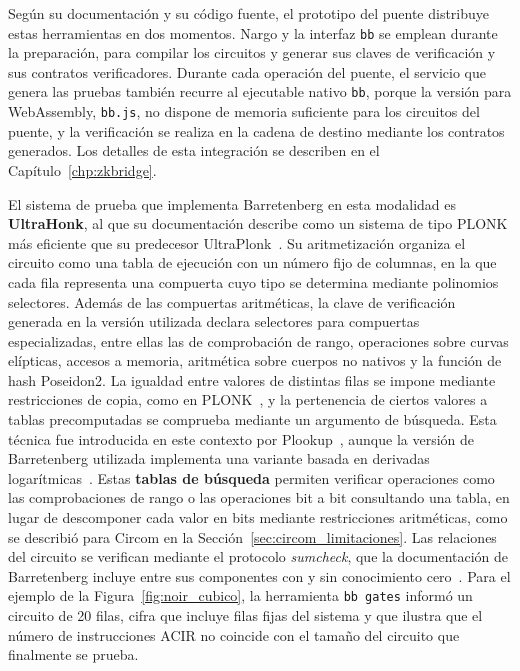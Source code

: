 Según su documentación y su código fuente, el prototipo del puente distribuye estas herramientas
en dos momentos. Nargo y la interfaz \texttt{bb} se emplean durante la preparación, para compilar
los circuitos y generar sus claves de verificación y sus contratos verificadores. Durante cada
operación del puente, el servicio que genera las pruebas también recurre al ejecutable nativo
\texttt{bb}, porque la versión para WebAssembly, \texttt{bb.js}, no dispone de memoria suficiente
para los circuitos del puente, y la verificación se realiza en la cadena de destino mediante los
contratos generados. Los detalles de esta integración se describen
en el Capítulo~\ref{chp:zkbridge}.

El sistema de prueba que implementa Barretenberg en esta modalidad es \textbf{UltraHonk}, al que
su documentación describe como un sistema de tipo PLONK más eficiente que su predecesor
UltraPlonk~\cite{barretenbergdocs, barretenbergsrc}. Su aritmetización organiza el circuito como
una tabla de ejecución con un número fijo de columnas, en la que cada fila representa una
compuerta cuyo tipo se determina mediante polinomios selectores. Además de las compuertas
aritméticas, la clave de verificación generada en la versión utilizada declara selectores para
compuertas especializadas, entre ellas las de comprobación de rango, operaciones sobre curvas
elípticas, accesos a memoria, aritmética sobre cuerpos no nativos y la función de hash
Poseidon2. La igualdad entre valores de distintas filas se impone mediante restricciones de
copia, como en PLONK~\cite{gabizon2019plonk}, y la pertenencia de ciertos valores a tablas
precomputadas se comprueba mediante un argumento de búsqueda. Esta técnica fue introducida en
este contexto por Plookup~\cite{gabizon2020plookup}, aunque la versión de Barretenberg utilizada
implementa una variante basada en derivadas logarítmicas~\cite{habock2022logup, barretenbergsrc}. Estas
\textbf{tablas de búsqueda} permiten verificar operaciones como las comprobaciones de rango o las
operaciones bit a bit consultando una tabla, en lugar de descomponer cada valor en bits mediante
restricciones aritméticas, como se describió para Circom en la Sección~\ref{sec:circom_limitaciones}.
Las relaciones del circuito se verifican mediante el protocolo \textit{sumcheck}, que la
documentación de Barretenberg incluye entre sus componentes con y sin conocimiento
cero~\cite{barretenbergsrc}. Para el ejemplo de la Figura~\ref{fig:noir_cubico}, la herramienta
\lstinline|bb gates| informó un circuito de 20 filas, cifra que incluye filas fijas del sistema y
que ilustra que el número de instrucciones ACIR no coincide con el tamaño del circuito que
finalmente se prueba.


